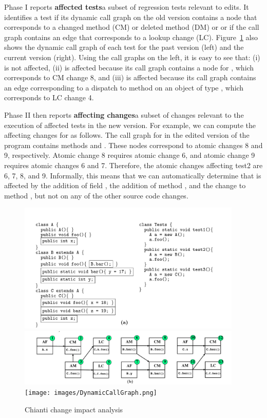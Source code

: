 Phase I reports {\bf affected tests}\textemdash a subset of regression tests relevant to edits. It identifies a test if its dynamic call graph on the old version contains a node that corresponds to a changed method (CM) or deleted method (DM)  or or if the call graph contains an edge that corresponds to a lookup change (LC). Figure~\ref{fig:chianti} also shows the dynamic call graph of each test for the past version (left) and the current version (right). Using the call graphs on the left, it is easy to see that: (i)  is not affected, (ii)  is affected because its call graph contains a node for , which corresponds to CM change 8, and (iii)  is affected because its call graph contains an edge corresponding to a dispatch to method  on an object of type , which corresponds to LC change 4.

Phase II then reports {\bf affecting changes}\textemdash a subset of changes relevant to the execution of affected tests in the new version. For example, we can compute the affecting changes for  as follows. The call graph for  in the edited version of the program contains methods  and . These nodes correspond to atomic changes 8 and 9, respectively. Atomic change 8 requires atomic change 6, and atomic change 9 requires atomic changes 6 and 7. Therefore, the atomic changes affecting test2 are 6, 7, 8, and 9. Informally, this means that we can automatically determine that  is affected by the addition of field , the addition of method , and the change to method , but not on any of the other source code changes. 

\begin{figure}
\centering
\includegraphics[width=0.95\textwidth]{images/ChiantiExample.pdf}
\includegraphics[width=0.95\textwidth]{images/ChiantiAtomicChange.pdf}
\texttt{[image: images/DynamicCallGraph.png]}
\caption{Chianti change impact analysis} 
\label{fig:chianti} 
\end{figure}

